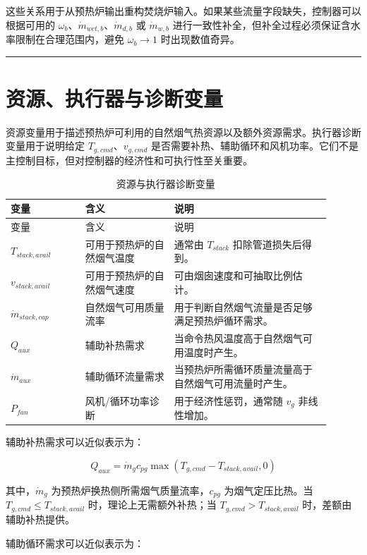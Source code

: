 \documentclass[UTF8,openany,zihao=-4,oneside]{ctexbook}
\newcommand{\manualdivider}{\par\vspace{0.6em}\noindent\textcolor{FGLine}{\rule{\linewidth}{0.7pt}}\vspace{0.6em}\par}
\begin{document}
这些关系用于从预热炉输出重构焚烧炉输入。如果某些流量字段缺失，控制器可以根据可用的 \(\omega_b\)、\(\dot m_{wet,b}\)、\(\dot m_{d,b}\) 或 \(\dot m_{w,b}\) 进行一致性补全，但补全过程必须保证含水率限制在合理范围内，避免 \(\omega_b\to 1\) 时出现数值奇异。

\manualdivider

\section{资源、执行器与诊断变量}\label{sec:resource-diagnostic-vars}

资源变量用于描述预热炉可利用的自然烟气热资源以及额外资源需求。执行器诊断变量用于说明给定 \(T_{g,cmd}\)、\(v_{g,cmd}\) 是否需要补热、辅助循环和风机功率。它们不是主控制目标，但对控制器的经济性和可执行性至关重要。

\begin{longtable}{@{}p{0.21\linewidth}p{0.25\linewidth}p{0.44\linewidth}@{}}
\caption{资源与执行器诊断变量}\label{tab:resource-vars}\\
\toprule
变量 & 含义 & 说明 \\
\midrule
\endfirsthead
\toprule
变量 & 含义 & 说明 \\
\midrule
\endhead
\(T_{stack,avail}\) & 可用于预热炉的自然烟气温度 & 通常由 \(T_{stack}\) 扣除管道损失后得到。 \\
\(v_{stack,avail}\) & 可用于预热炉的自然烟气速度 & 可由烟囱速度和可抽取比例估计。 \\
\(\dot m_{stack,cap}\) & 自然烟气可用质量流率 & 用于判断自然烟气流量是否足够满足预热炉循环需求。 \\
\(Q_{aux}\) & 辅助补热需求 & 当命令热风温度高于自然烟气可用温度时产生。 \\
\(\dot m_{aux}\) & 辅助循环流量需求 & 当预热炉所需循环质量流量高于自然烟气可用流量时产生。 \\
\(P_{fan}\) & 风机/循环功率诊断 & 用于经济性惩罚，通常随 \(v_g\) 非线性增加。 \\
\bottomrule
\end{longtable}

辅助补热需求可以近似表示为：

\[
Q_{aux}=\dot m_g c_{pg}\max\left(T_{g,cmd}-T_{stack,avail},0\right)
\]

其中，\(\dot m_g\) 为预热炉换热侧所需烟气质量流率，\(c_{pg}\) 为烟气定压比热。当 \(T_{g,cmd}\leq T_{stack,avail}\) 时，理论上无需额外补热；当 \(T_{g,cmd}>T_{stack,avail}\) 时，差额由辅助补热提供。

辅助循环需求可以近似表示为：
\end{document}
